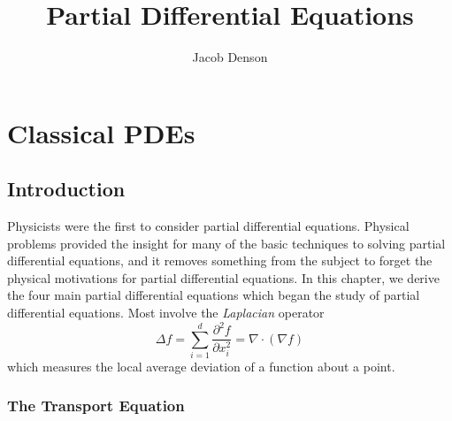 

\title{Partial Differential Equations}
\author{Jacob Denson}




\maketitle

\tableofcontents


\part{Classical PDEs}

\chapter{Introduction}

Physicists were the first to consider partial differential equations. Physical problems provided the insight for many of the basic techniques to solving partial differential equations, and it removes something from the subject to forget the physical motivations for partial differential equations. In this chapter, we derive the four main partial differential equations which began the study of partial differential equations. Most involve the \emph{Laplacian} operator
%
\[ \Delta f = \sum_{i = 1}^d \frac{\partial^2 f}{\partial x_i^2} = \nabla \cdot (\nabla f) \]
%
which measures the local average deviation of a function about a point.

\section{The Transport Equation}

